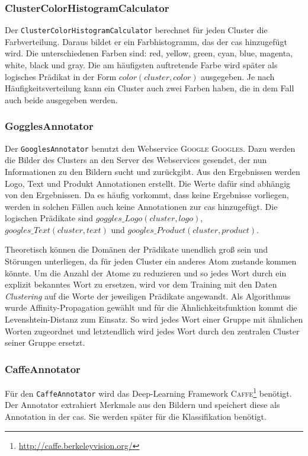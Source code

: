 \subsubsection{ClusterColorHistogramCalculator}
Der \texttt{ClusterColorHistogramCalculator} berechnet für jeden Cluster die Farbverteilung. Daraus bildet er ein Farbhistogramm, das der \gls{cas} hinzugefügt wird. Die unterschiedenen Farben sind: red, yellow, green, cyan, blue, magenta, white, black und gray. Die am häufigsten auftretende Farbe wird später als logisches Prädikat in der Form $color(cluster,  color)$ ausgegeben. Je nach Häufigkeitsverteilung kann ein Cluster auch zwei Farben haben, die in dem Fall auch beide ausgegeben werden. 

\subsubsection{GogglesAnnotator}
Der \texttt{GooglesAnnotator} benutzt den Webservice \textsc{Google Googles}. Dazu werden die Bilder des Clusters an den Server des Webservices gesendet, der nun Informationen zu den Bildern sucht und zurückgibt. Aus den Ergebnissen werden Logo, Text und Produkt Annotationen erstellt. Die Werte dafür sind abhängig von den Ergebnissen. Da es häufig vorkommt, dass keine Ergebnisse vorliegen, werden in solchen Fällen auch keine Annotationen zur \gls{cas} hinzugefügt. Die logischen Prädikate sind $goggles\_Logo(cluster, logo)$, $googles\_Text(cluster, text)$ und $googles\_Product(cluster, product)$. \par

Theoretisch können die Domänen der Prädikate unendlich groß sein und Störungen unterliegen, da für jeden Cluster ein anderes Atom zustande kommen könnte. Um die Anzahl der Atome zu reduzieren und so jedes Wort durch ein explizit bekanntes Wort zu ersetzen, wird vor dem Training mit den Daten \textit{Clustering} auf die Worte der jeweiligen Prädikate angewandt. Als Algorithmus wurde Affinity-Propagation gewählt und für die Ähnlichkeitsfunktion kommt die Levenshtein-Distanz zum Einsatz. So wird jedes Wort einer Gruppe mit ähnlichen Worten zugeordnet und letztendlich wird jedes Wort durch den zentralen Cluster seiner Gruppe ersetzt. 


\subsubsection{CaffeAnnotator}
\label{sec:caffeAnno}
Für den \texttt{CaffeAnnotator} wird das Deep-Learning Framework \textsc{Caffe}\footnote{\url{http://caffe.berkeleyvision.org/}} benötigt. Der Annotator extrahiert Merkmale aus den Bildern und speichert diese als Annotation in der \gls{cas}. Sie werden später für die Klassifikation benötigt.  

